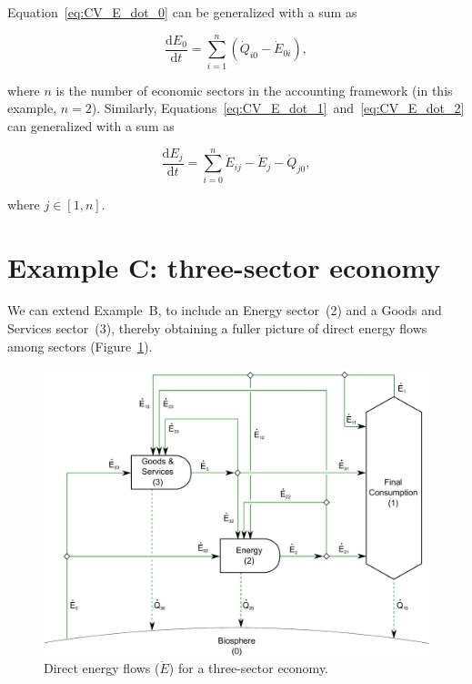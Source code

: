 
Equation~\ref{eq:CV_E_dot_0} can be generalized with a sum as

\begin{equation} \label{eq:CV_E_biosphere_general}
	\frac{\mathrm{d}E_{0}}{\mathrm{d}t} 
	= \sum\limits_{i=1}^n \left( \dot{Q}_{i0} - \dot{E}_{0i} \right),
\end{equation}

\noindent where $n$ is the number of economic sectors in the accounting framework
(in this example, $n = 2$).
Similarly, Equations~\ref{eq:CV_E_dot_1}~and~\ref{eq:CV_E_dot_2} 
can generalized with a sum as

\begin{equation} \label{eq:B-CV_E_econ_general}
	\frac{\mathrm{d}E_{j}}{\mathrm{d}t} 
	= \sum\limits_{i=0}^n\dot{E}_{ij} 
	- \dot{E}_{j}  
	- \dot{Q}_{j0},
\end{equation}

\noindent where $j \in [1, n]$.


\section{Example C: three-sector economy} %
\label{sec:C_energy}

We can extend Example~B, to include an Energy sector~(2) 
and a Goods and Services sector~(3), thereby obtaining
a fuller picture of direct energy flows among sectors
(Figure~\ref{fig:C_energy}).

\begin{figure}[!ht]
\centering
\includegraphics[width=0.8\linewidth]{Part_1/Chapter_Energy/images/3_sector_direct_energy.pdf}
\caption[Direct energy flows for a three-sector economy]{Direct energy flows ($\dot{E}$) for a three-sector economy.}
\label{fig:C_energy}
\end{figure}

